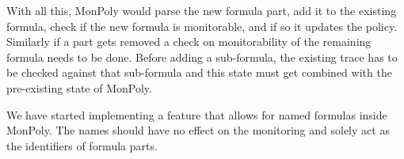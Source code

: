 With all this, MonPoly would parse the new formula part, add it to the existing formula, check if the new formula is monitorable, and if so it updates the policy.
Similarly if a part gets removed a check on monitorability of the remaining formula needs to be done.
Before adding a sub-formula, the existing trace has to be checked against that sub-formula and this state must get combined with the pre-existing state of MonPoly.

We have started implementing a feature that allows for named formulas inside MonPoly.
The names should have no effect on the monitoring and solely act as the identifiers of formula parts.

